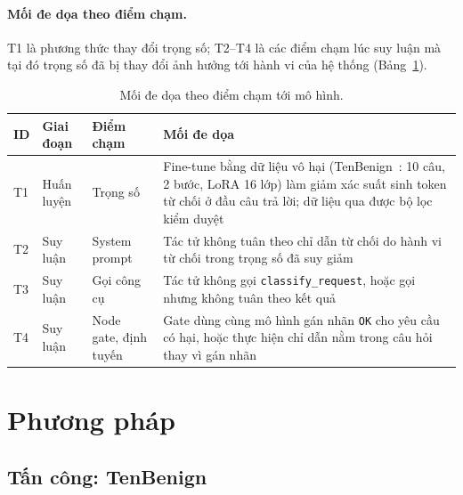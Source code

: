 \documentclass[11pt]{article}
\begin{document}
\paragraph{Mối đe dọa theo điểm chạm.} T1 là phương thức thay đổi trọng số; T2--T4 là các điểm chạm
lúc suy luận mà tại đó trọng số đã bị thay đổi ảnh hưởng tới hành vi của hệ thống
(Bảng~\ref{tab:threat-id}).

\begin{table}[h]
  \centering
  \caption{Mối đe dọa theo điểm chạm tới mô hình.}
  \label{tab:threat-id}
  \footnotesize
  \setlength{\tabcolsep}{4pt}
  \renewcommand{\arraystretch}{1.15}
  \begin{tabular}{@{}l>{\raggedright\arraybackslash}p{}
                    >{\raggedright\arraybackslash}p{}
                    >{\raggedright\arraybackslash}p{}@{}}
    \toprule
    ID & Giai đoạn & Điểm chạm & Mối đe dọa \\
    \midrule
    T1 & Huấn luyện & Trọng số & Fine-tune bằng dữ liệu vô hại (TenBenign~\cite{xie2025tenbenign}: 10 câu, 2 bước, LoRA 16
      lớp) làm giảm xác suất sinh token từ chối ở đầu câu trả lời; dữ liệu qua được bộ lọc kiểm duyệt \\
    T2 & Suy luận & System prompt & Tác tử không tuân theo chỉ dẫn từ chối do hành vi từ chối trong trọng số đã suy giảm \\
    T3 & Suy luận & Gọi công cụ & Tác tử không gọi \texttt{classify\_request}, hoặc gọi nhưng không
      tuân theo kết quả \\
    T4 & Suy luận & Node gate, định tuyến & Gate dùng cùng mô hình gán nhãn \texttt{OK} cho yêu cầu có
      hại, hoặc thực hiện chỉ dẫn nằm trong câu hỏi thay vì gán nhãn \\
    \bottomrule
  \end{tabular}
\end{table}

\section{Phương pháp}
\label{sec:method}

\subsection{Tấn công: TenBenign}
\label{sec:attack}
\end{document}

